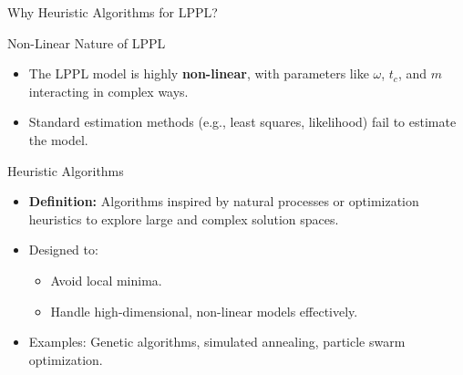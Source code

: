 \documentclass{beamer}
\begin{document}

\begin{frame}{Why Heuristic Algorithms for LPPL?}
    \begin{block}{Non-Linear Nature of LPPL}
        \begin{itemize}
            \item The LPPL model is highly \textbf{non-linear}, with parameters like \(\omega\), \(t_c\), and \(m\) interacting in complex ways.
            \item Standard estimation methods (e.g., least squares, likelihood) fail to estimate the model.
        \end{itemize}
    \end{block}
    \begin{block}{Heuristic Algorithms}
        \begin{itemize}
            \item \textbf{Definition:} Algorithms inspired by natural processes or optimization heuristics to explore large and complex solution spaces.
            \item Designed to:
            \begin{itemize}
                \item Avoid local minima.
                \item Handle high-dimensional, non-linear models effectively.
            \end{itemize}
            \item Examples: Genetic algorithms, simulated annealing, particle swarm optimization.
        \end{itemize}
    \end{block}
\end{frame}
\end{document}
